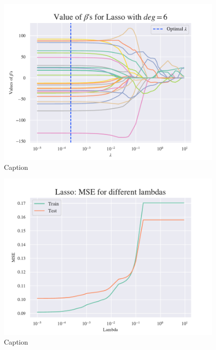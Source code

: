 \begin{figure}
    \centering
    \includegraphics[width=1\linewidth]{project_1/figures/figures_in_appendix/Lasso_Betas_lambda_terrain_const_deg.pdf}
    \caption{Caption}
    \label{fig:ref}
\end{figure}

\begin{figure}
    \centering
    \includegraphics[width=1\linewidth]{project_1/figures/figures_in_appendix/Lasso_MSE_Franke_Noise.pdf}
    \caption{Caption}
    \label{fig:ref}
\end{figure}

